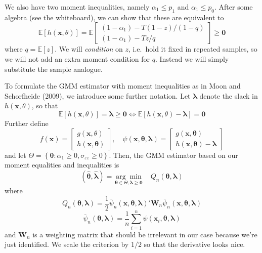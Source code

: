 \documentclass[12pt]{article}
\begin{document}
We also have two moment inequalities, namely $\alpha_1 \leq p_1$ and $\alpha_1 \leq p_0$.
After some algebra (see the whiteboard), we can show that these are equivalent to
\[
  \mathbb{E}\left[ h(\mathbf{x},\theta) \right] = \mathbb{E}
  \left[
  \begin{array}{c}
    (1 - \alpha_1) - T(1 - z)/(1 - q)\\
    (1 - \alpha_1) - Tz/q
  \end{array}
\right] \geq \mathbf{0}
\]
where $q = \mathbb{E}[z]$.
We will \emph{condition} on $z$, i.e.\ hold it fixed in repeated samples, so we will not add an extra moment condition for $q$.
Instead we will simply substitute the sample analogue.

To formulate the GMM estimator with moment inequalities as in Moon and Schorfheide (2009), we introduce some further notation.
Let $\boldsymbol{\lambda}$ denote the slack in $h(\mathbf{x}, \theta)$, so that
\[
  \mathbb{E}[h(\mathbf{x},\theta)] = \boldsymbol{\lambda} \geq \mathbf{0} \iff \mathbb{E}[h(\mathbf{x}, \theta) - \boldsymbol{\lambda}] = \mathbf{0}
\]
Further define
\[
  f(\mathbf{x}) = \left[
  \begin{array}{c}
    g(\mathbf{x},\theta) \\ h(\mathbf{x},\boldsymbol{\theta})
  \end{array}
\right], \quad
\psi(\mathbf{x}, \boldsymbol{\theta}, \boldsymbol{\lambda}) = 
\left[
\begin{array}{c}
  g(\mathbf{x}, \boldsymbol{\theta})\\
  h(\mathbf{x}, \boldsymbol{\theta}) - \boldsymbol{\lambda}
\end{array}
\right]
\]
and let $\Theta = \left\{ \boldsymbol{\theta}\colon \alpha_1 \geq 0, \sigma_{\varepsilon\varepsilon}\geq 0 \right\}$.
Then, the GMM estimator based on our moment equalities and inequalities is
\[
  (\widehat{\boldsymbol{\theta}}, \widehat{\boldsymbol{\lambda}}) = \underset{\boldsymbol{\theta} \in \Theta, \boldsymbol{\lambda} \geq \mathbf{0}}{\arg\min} \quad Q_n(\boldsymbol{\theta}, \boldsymbol{\lambda})
\]
where
\[ 
  Q_n(\boldsymbol{\theta}, \boldsymbol{\lambda}) = \frac{1}{2}\bar{\psi}_n(\mathbf{x},\boldsymbol{\theta}, \boldsymbol{\lambda})' \mathbf{W}_n \bar{\psi}_n(\mathbf{x}, \boldsymbol{\theta}, \boldsymbol{\lambda})
\]
\[
  \bar{\psi}_n(\boldsymbol{\theta}, \boldsymbol{\lambda}) = \frac{1}{n}\sum_{i=1}^n \psi(\mathbf{x}_i, \boldsymbol{\theta}, \boldsymbol{\lambda}) 
\]
and $\mathbf{W}_n$ is a weighting matrix that should be irrelevant in our case because we're just identified.
We scale the criterion by $1/2$ so that the derivative looks nice.
\end{document}
